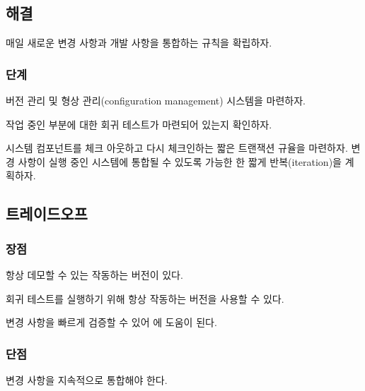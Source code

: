 \documentclass[a4paper,10pt,twoside]{book}
\begin{document}
\subsection*{해결}

매일 새로운 변경 사항과 개발 사항을 통합하는 규칙을 확립하자.

\subsubsection*{단계}

\begin{bulletlist}
\item 버전 관리 및 형상 관리(configuration management) 시스템을 마련하자.

\item 작업 중인 부분에 대한 회귀 테스트가 마련되어 있는지 확인하자.

\item 시스템 컴포넌트를 체크 아웃하고 다시 체크인하는 짧은 트랜잭션 규율을 마련하자. 변경 사항이 실행 중인 시스템에 통합될 수 있도록 가능한 한 짧게 반복(iteration)을 계획하자.
\end{bulletlist}

\subsection*{트레이드오프}

\subsubsection*{장점}

\begin{bulletlist}
\item 항상 데모할 수 있는 작동하는 버전이 있다.

\item 회귀 테스트를 실행하기 위해 항상 작동하는 버전을 사용할 수 있다.

\item 변경 사항을 빠르게 검증할 수 있어 에 도움이 된다.
\end{bulletlist}

\subsubsection*{단점}

\begin{bulletlist}
\item 변경 사항을 지속적으로 통합해야 한다.
\end{bulletlist}
\end{document}
